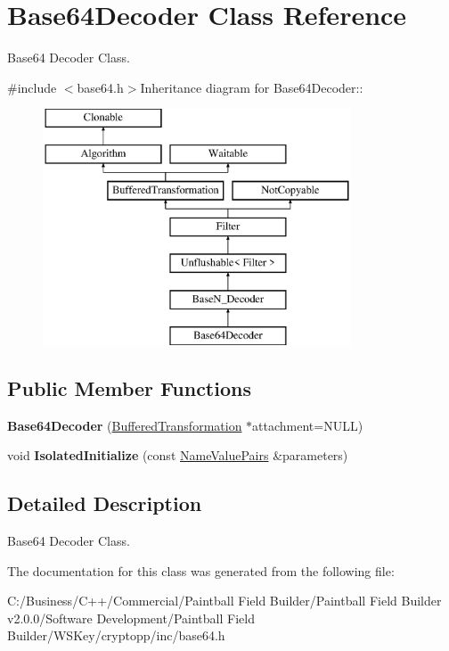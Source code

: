 \hypertarget{class_base64_decoder}{
\section{Base64Decoder Class Reference}
\label{class_base64_decoder}
}


Base64 Decoder Class.  


{\ttfamily \#include $<$base64.h$>$}Inheritance diagram for Base64Decoder::\begin{figure}[H]
\begin{center}
\leavevmode
\includegraphics[height=7cm]{class_base64_decoder}
\end{center}
\end{figure}
\subsection*{Public Member Functions}
\begin{DoxyCompactItemize}
\item 
\hypertarget{class_base64_decoder_aa21a74a50f1fa79b255d9466bd9a87fc}{
{\bfseries Base64Decoder} (\hyperlink{class_buffered_transformation}{BufferedTransformation} $\ast$attachment=NULL)}
\label{class_base64_decoder_aa21a74a50f1fa79b255d9466bd9a87fc}

\item 
\hypertarget{class_base64_decoder_a78677d90f12a96b6239f42c7faa14cc8}{
void {\bfseries IsolatedInitialize} (const \hyperlink{class_name_value_pairs}{NameValuePairs} \&parameters)}
\label{class_base64_decoder_a78677d90f12a96b6239f42c7faa14cc8}

\end{DoxyCompactItemize}


\subsection{Detailed Description}
Base64 Decoder Class. 

The documentation for this class was generated from the following file:\begin{DoxyCompactItemize}
\item 
C:/Business/C++/Commercial/Paintball Field Builder/Paintball Field Builder v2.0.0/Software Development/Paintball Field Builder/WSKey/cryptopp/inc/base64.h\end{DoxyCompactItemize}

